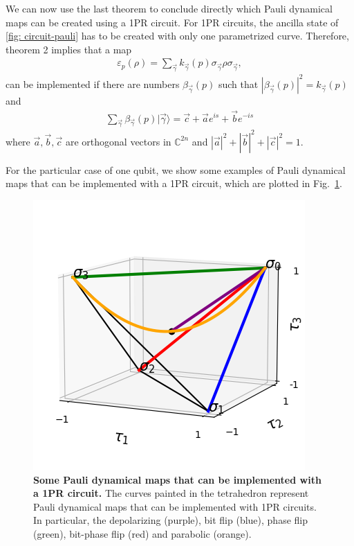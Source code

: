 \documentclass[10pt,letterpaper]{article} %
\newcommand{\fref}[1]{Fig.~\ref{#1}}
\begin{document}
We can now use the last theorem to conclude directly which Pauli dynamical maps
can be created using a 1PR circuit.
For 1PR circuits, the ancilla state of \ref{fig: circuit-pauli} 
has to be created with only one parametrized curve. Therefore, theorem 2 implies that a map
\begin{eqnarray}
\varepsilon_p(\rho) = \sum_{\vec{\gamma}} k_{\vec{\gamma}}(p) \sigma_{\vec{\gamma}} \rho \sigma_{\vec{\gamma}},
\end{eqnarray}
can be implemented  if there are numbers $\beta_{\vec{\gamma}}(p)$ such that $|\beta_{\vec{\gamma}}(p)|^2 = k_{\vec{\gamma}}(p)$ and
\begin{eqnarray}
\sum_{\vec{\gamma}} \beta_{\vec{\gamma}}(p) |\vec{\gamma}\rangle = \vec{c} + \vec{a} e^{is} + \vec{b} e^{-is}
\end{eqnarray}
where $\vec{a},\vec{b},\vec{c}$ are orthogonal vectors in $\mathbb{C}^{2n}$ 
and $|\vec{a}|^2+  |\vec{b}|^2 + |\vec{c}|^2= 1$.

For the particular case of one qubit,
we show some examples of Pauli dynamical maps that can be
implemented with a 1PR circuit, which are plotted
in \fref{fig:curves}.


\begin{figure} %
\centering
\includegraphics{images/curvas.png}
\caption{{\bf Some Pauli dynamical maps that can be implemented with a 1PR circuit.}
The curves painted in the tetrahedron
represent Pauli dynamical maps that can be implemented with 1PR circuits.
In particular, the depolarizing (purple), bit flip (blue),
phase flip (green), bit-phase flip (red)
and parabolic (orange). }
\label{fig:curves}
\end{figure}
\end{document}
